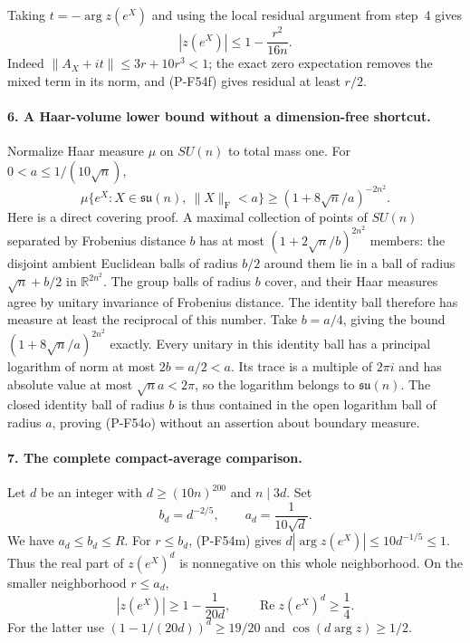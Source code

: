 \documentclass[11pt,a4paper]{article}
\begin{document}
Taking $t=-\arg z(e^X)$ and using the local residual argument
from step~4 gives
\[
                         |z(e^X)|\le1-\frac{r^2}{16n}.
                                                               \tag{P-F54n}
\]
Indeed $\|A_X+it\|\le3r+10r^3<1$; the exact zero
expectation removes the mixed term in its norm, and
(P-F54f) gives residual at least $r/2$.

\paragraph{6. A Haar-volume lower bound without a dimension-free shortcut.}
Normalize Haar measure $\mu$ on $SU(n)$ to total mass one.
For $0<a\le1/(10\sqrt n)$,
\[
 \mu\{e^X:X\in\mathfrak{su}(n),\ \|X\|_{\mathrm F}<a\}
                   \ge(1+8\sqrt n/a)^{-2n^2}.                \tag{P-F54o}
\]
Here is a direct covering proof. A maximal collection of
points of $SU(n)$ separated by Frobenius distance $b$ has
at most $(1+2\sqrt n/b)^{2n^2}$ members: the disjoint
ambient Euclidean balls of radius $b/2$ around them lie
in a ball of radius $\sqrt n+b/2$ in
$\mathbb R^{2n^2}$. The group balls of radius $b$ cover,
and their Haar measures agree by unitary invariance of
Frobenius distance. The identity ball therefore has
measure at least the reciprocal of this number.
Take $b=a/4$, giving the bound
$(1+8\sqrt n/a)^{2n^2}$ exactly.
Every unitary in this identity ball has a principal logarithm
of norm at most $2b=a/2<a$. Its trace is a multiple of $2\pi i$
and has absolute value at most $\sqrt n a<2\pi$, so the
logarithm belongs to $\mathfrak{su}(n)$.
The closed identity ball of radius $b$ is thus contained
in the open logarithm ball of radius $a$, proving (P-F54o)
without an assertion about boundary measure.

\paragraph{7. The complete compact-average comparison.}
Let $d$ be an integer with $d\ge(10n)^{200}$ and $n\mid3d$.
Set
\[
             b_d=d^{-2/5},\qquad a_d=\frac1{10\sqrt d}.
\]
We have $a_d\le b_d\le R$.
For $r\le b_d$, (P-F54m) gives
$d|\arg z(e^X)|\le10d^{-1/5}\le1$.
Thus the real part of $z(e^X)^d$ is nonnegative on this
whole neighborhood. On the smaller neighborhood $r\le a_d$,
\[
 |z(e^X)|\ge1-\frac1{20d},
 \qquad \operatorname{Re}z(e^X)^d\ge\frac14.                \tag{P-F54p}
\]
For the latter use $(1-1/(20d))^d\ge19/20$ and
$\cos(d\arg z)\ge1/2$.
\end{document}
